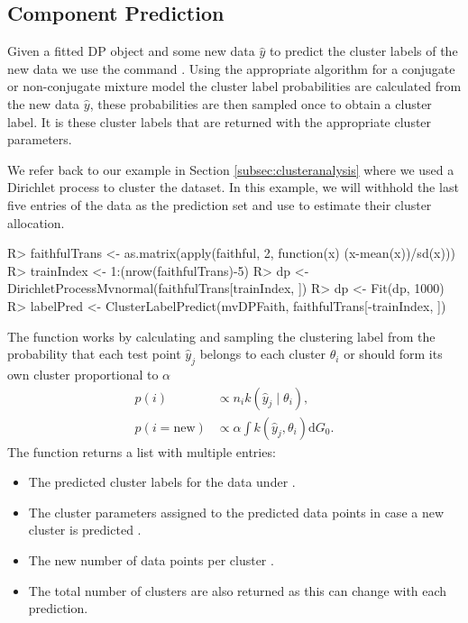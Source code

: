 \documentclass[nojss]{jss}
\begin{document}
\subsection{Component Prediction}
Given a fitted DP object and some new data $\hat{y}$ to predict the cluster labels of the new data we use the command . Using the appropriate algorithm for a conjugate or non-conjugate mixture model the cluster label probabilities are calculated from the new data $\hat{y}$, these probabilities are then sampled once to obtain a cluster label. It is these cluster labels that are returned with the appropriate cluster parameters.

We refer back to our example in Section \ref{subsec:clusteranalysis} where we used a Dirichlet process to cluster the  dataset. In this example, we will withhold the last five entries of the data as the prediction set and use  to estimate their cluster allocation.

\begin{Schunk}
\begin{Sinput}
R> faithfulTrans <- as.matrix(apply(faithful, 2, function(x) (x-mean(x))/sd(x)))
R> trainIndex <- 1:(nrow(faithfulTrans)-5)
R> dp <-  DirichletProcessMvnormal(faithfulTrans[trainIndex, ])
R> dp <- Fit(dp, 1000)
R> labelPred <- ClusterLabelPredict(mvDPFaith, faithfulTrans[-trainIndex, ])
\end{Sinput}
\end{Schunk}

The function  works by calculating and sampling the clustering label from the probability that each test point $\hat{y} _j$ belongs to each cluster $\theta _i$ or should form its own cluster proportional to $\alpha$
\begin{align*}
p(i) & \propto n_i k(\hat{y} _j \mid \theta _i), \\
p(i=\text{new}) & \propto \alpha \int k(\hat{y} _j , \theta _i) \mathrm{d} G_0.
\end{align*}
The function returns a list with multiple entries:
\begin{itemize}
\item The predicted cluster labels for the data under .
\item The cluster parameters assigned to the predicted data points in case a new cluster is predicted .
\item The new number of data points per cluster .
\item The total number of clusters are also returned  as this can change with each prediction.
\end{itemize}
\end{document}

